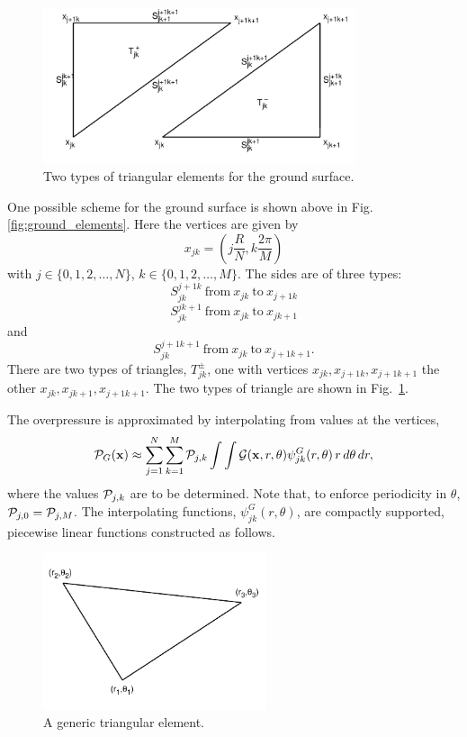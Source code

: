 \begin{figure}[h]
  \centering
  \includegraphics[height=130pt]{figures/ground_triangles.pdf}
  \caption{Two types of triangular elements for the ground surface.}
  \label{fig:ground_triangles}
\end{figure}

One possible scheme for the ground surface is shown above in Fig.\, \ref{fig:ground_elements}. Here the vertices are given by 
\[
x_{jk}=(j\frac{R}{N},k\frac{2\pi}{M})
\]
with $j\in\{0,1,2,\dots,N\}$, $k\in\{0,1,2,\dots,M\}$. The sides are of three types: 
\[
S_{jk}^{j+1 k}\ \text{from}\ x_{jk}\ \text{to}\ x_{j+1 k}
\]
\[
S_{jk}^{j k+1}\ \text{from}\ x_{jk}\ \text{to}\ x_{j k+1}
\]
and
\[
S_{jk}^{j+1 k+1}\ \text{from}\ x_{jk}\ \text{to}\ x_{j+1 k+1}.
\]
There are two types of triangles, $T^{\pm}_{jk}$, one with vertices $x_{jk},x_{j+1 k}, x_{j+1 k+1}$ the other $x_{jk},x_{j k+1}, x_{j+1 k+1}$. The two types of triangle are shown in Fig.\, \ref{fig:ground_triangles}. 

The overpressure is approximated by interpolating from values at the vertices, 
\[
{\cal P}_G({\bf x})
\approx
\sum_{j=1}^N\sum_{k=1}^M {\cal P}_{j,k}
\int\int{\cal G}({\bf x},r,\theta)\psi^{G}_{jk}(r,\theta)\, r\, d\theta\, dr, 
\]
where the values ${\cal P}_{j,k}$ are to be determined. Note that, to enforce periodicity in $\theta$, ${\cal P}_{j,0}={\cal P}_{j,M}$. The interpolating functions, $\psi^{G}_{jk}(r,\theta)$, are compactly supported, piecewise linear functions constructed as follows. 

\begin{figure}[h]
  \centering
  \includegraphics[height=130pt]{figures/gen_triangle.pdf}
  \caption{A generic triangular element.}
  \label{fig:gen_triangle}
\end{figure}


